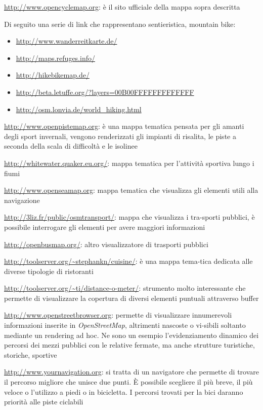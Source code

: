 \documentclass[a4paper,twoside,12pt,]{article}
\newcommand{\osm}{\emph{OpenStreetMap}\xspace}
\begin{document}
\url{http://www.opencyclemap.org}: è il sito ufficiale della mappa sopra descritta

Di seguito una serie di link che rappresentano sentieristica, mountain bike:
\begin{itemize}
 \item \url{http://www.wanderreitkarte.de/}
 \item \url{http://maps.refuges.info/}
 \item \url{http://hikebikemap.de/}
 \item \url{http://beta.letuffe.org/?layers=00B00FFFFFFFFFFFFF}
 \item \url{http://osm.lonvia.de/world_hiking.html}
\end{itemize}

\url{http://www.openpistemap.org}: è una mappa tematica pensata per gli amanti degli sport invernali, vengono renderizzati gli impianti di risalita, le piste a seconda della scala di difficoltà e le isolinee

\url{http://whitewater.quaker.eu.org/}: mappa tematica per l'attività sportiva lungo i fiumi

\url{http://www.openseamap.org}: mappa tematica che visualizza gli elementi utili alla navigazione

\url{http://3liz.fr/public/osmtransport/}: mappa che visualizza i tra-sporti pubblici, è possibile interrogare gli elementi per avere maggiori informazioni

\url{http://openbusmap.org/}: altro visualizzatore di trasporti pubblici

\url{http://toolserver.org/~stephankn/cuisine/}: è una mappa tema-tica dedicata alle diverse tipologie di ristoranti

\url{http://toolserver.org/~ti/distance-o-meter/}: strumento molto interessante che permette di visualizzare la copertura di diversi elementi puntuali attraverso buffer

\url{http://www.openstreetbrowser.org}: permette di visualizzare innumerevoli informazioni inserite in \osm, altrimenti nascoste o vi-sibili soltanto mediante un rendering ad hoc. Ne sono un esempio l'evidenziamento dinamico dei percorsi dei mezzi pubblici con le relative fermate, ma anche strutture turistiche, storiche, sportive

\url{http://www.yournavigation.org}: si tratta di un navigatore che permette di trovare il percorso migliore che unisce due punti. È possibile scegliere il più breve, il più veloce o l'utilizzo a piedi o in bicicletta. I percorsi trovati per la bici daranno priorità alle piste ciclabili
\end{document}
